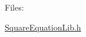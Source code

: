 Files\+:
\begin{DoxyItemize}
\item \mbox{\hyperlink{_square_equation_lib_8h}{Square\+Equation\+Lib.\+h}} 
\end{DoxyItemize}